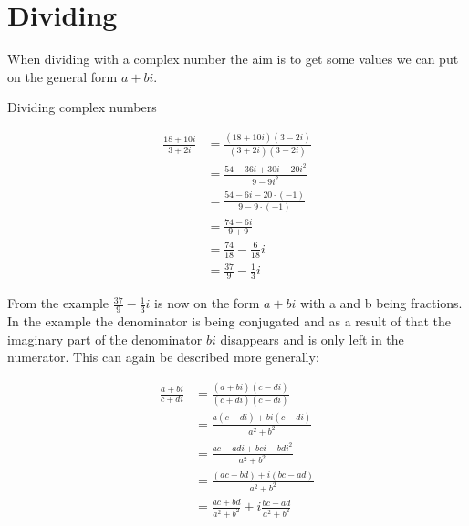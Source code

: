 \section{Dividing}
When dividing with a complex number the aim is to get some values we can put on the general form $a + bi$. 
\begin{example}{Dividing complex numbers}{}

\begin{align*}
\frac{18 + 10i}{3 + 2i} &= \frac{(18 + 10i)(3 - 2i)}{(3+2i)(3-2i)} \\[1em]
&= \frac{54 - 36i + 30i - 20i^2}{9 - 9i^2} \\[1em]
&= \frac{54 - 6i - 20 \cdot (-1)}{9 - 9 \cdot (-1)} \\[1em]
&= \frac{74 - 6i}{9 + 9} \\[1em]
&= \frac{74}{18} - \frac{6}{18}i \\[1em]
&= \frac{37}{9} - \frac{1}{3}i
\end{align*}
\end{example}
From the example $\frac{37}{9} - \frac{1}{3}i$ is now on the form $a+bi$ with a and b being fractions. In the example the denominator is being conjugated and as a result of that the imaginary part of the denominator $bi$ disappears and is only left in the numerator. 
This can again be described more generally:
\begin{center}
\begin{align*}
\frac{a + bi}{c + di} 										
&= \frac{(a+bi)(c-di)}{(c+di)(c-di)} 						\\[1em]
&= \frac{a(c-di)+bi(c-di)}{a^2+b^2} 							\\[1em]
&= \frac{ac-adi+bci-bdi^2}{a^2+b^2}							\\[1em]
&= \frac{(ac+bd)+i(bc-ad)}{a^2+b^2}							\\[1em]
&= \frac{ac+bd}{a^2+b^2}+i \frac{bc-ad}{a^2+b^2}				
\end{align*}
\end{center}

